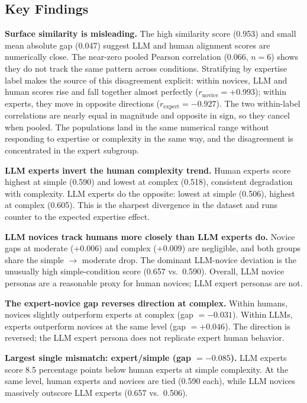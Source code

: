\documentclass{sigchi-ext}
\begin{document}
\subsection{Key Findings}

\textbf{Surface similarity is misleading.}
The high similarity score (0.953) and small mean absolute gap (0.047) suggest LLM and human alignment scores are numerically close. The near-zero pooled Pearson correlation (0.066, $n=6$) shows they do not track the same pattern across conditions. Stratifying by expertise label makes the source of this disagreement explicit: within novices, LLM and human scores rise and fall together almost perfectly ($r_{\text{novice}} = +0.993$); within experts, they move in opposite directions ($r_{\text{expert}} = -0.927$). The two within-label correlations are nearly equal in magnitude and opposite in sign, so they cancel when pooled. The populations land in the same numerical range without responding to expertise or complexity in the same way, and the disagreement is concentrated in the expert subgroup.

\textbf{LLM experts invert the human complexity trend.}
Human experts score highest at simple (0.590) and lowest at complex (0.518), consistent degradation with complexity. LLM experts do the opposite: lowest at simple (0.506), highest at complex (0.605). This is the sharpest divergence in the dataset and runs counter to the expected expertise effect.

\textbf{LLM novices track humans more closely than LLM experts do.}
Novice gaps at moderate ($+0.006$) and complex ($+0.009$) are negligible, and both groups share the simple $\rightarrow$ moderate drop. The dominant LLM-novice deviation is the unusually high simple-condition score (0.657 vs.\ 0.590). Overall, LLM novice personas are a reasonable proxy for human novices; LLM expert personas are not.

\textbf{The expert-novice gap reverses direction at complex.}
Within humans, novices slightly outperform experts at complex (gap $= -0.031$). Within LLMs, experts outperform novices at the same level (gap $= +0.046$). The direction is reversed; the LLM expert persona does not replicate expert human behavior.

\textbf{Largest single mismatch: expert/simple (gap $= -0.085$).}
LLM experts score 8.5 percentage points below human experts at simple complexity. At the same level, human experts and novices are tied (0.590 each), while LLM novices massively outscore LLM experts (0.657 vs.\ 0.506).
\end{document}
